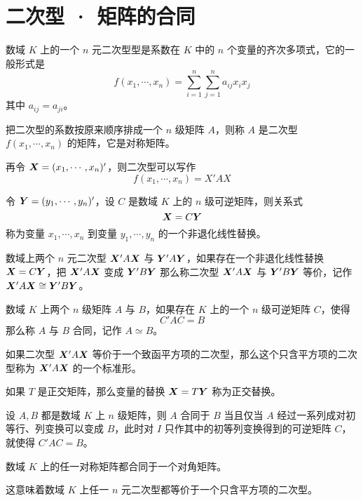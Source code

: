 \chapter{二次型 · 矩阵的合同}

\begin{definition}
    数域 $K$ 上的一个 $n$ 元二次型型是系数在 $K$ 中的 $n$ 个变量的齐次多项式，它的一般形式是
    $$f(x_1,\cdots,x_n) = \sum_{i=1}^n\sum_{j=1}^na_{ij}x_ix_j$$
    其中 $a_{ij} = a_{ji}$。
\end{definition}

把二次型的系数按原来顺序排成一个 $n$ 级矩阵 $A$，则称 $A$ 是二次型 $f(x_1,\cdots,x_n)$ 的矩阵，它是对称矩阵。

再令 $\boldsymbol{X} = (x_1,\cdots,x_n)'$，则二次型可以写作
$$f(x_1,\cdots,x_n) = X'AX$$

令 $\boldsymbol{Y} = (y_1,\cdots,y_n)'$，设 $C$ 是数域 $K$ 上的 $n$ 级可逆矩阵，则关系式
$$\boldsymbol{X} = C\boldsymbol{Y}$$
称为变量 $x_1,\cdots,x_n$ 到变量 $y_1,\cdots,y_n$ 的一个非退化线性替换。

\begin{definition}
    数域上两个 $n$ 元二次型 $\boldsymbol{X}'A\boldsymbol{X}$ 与 $\boldsymbol{Y}'A\boldsymbol{Y}$，如果存在一个非退化线性替换 $\boldsymbol{X} = C\boldsymbol{Y}$，把 $\boldsymbol{X}'A\boldsymbol{X}$ 变成 $\boldsymbol{Y}'B\boldsymbol{Y}$ 那么称二次型 $\boldsymbol{X}'A\boldsymbol{X}$ 与 $\boldsymbol{Y}'B\boldsymbol{Y}$ 等价，记作 $\boldsymbol{X}'A\boldsymbol{X} \cong \boldsymbol{Y}'B\boldsymbol{Y}$。
\end{definition}

\begin{definition}
    数域 $K$ 上两个 $n$ 级矩阵 $A$ 与 $B$，如果存在 $K$ 上的一个 $n$ 级可逆矩阵 $C$，使得
    $$C'AC = B$$
    那么称 $A$ 与 $B$ 合同，记作 $A\simeq B$。
\end{definition}

如果二次型 $\boldsymbol{X}' A \boldsymbol{X}$ 等价于一个致函平方项的二次型，那么这个只含平方项的二次型称为 $\boldsymbol{X}'A\boldsymbol{X}$ 的一个标准形。

如果 $T$ 是正交矩阵，那么变量的替换 $\boldsymbol{X} = T\boldsymbol{Y}$ 称为正交替换。

\begin{theorem}
    设 $A,B$ 都是数域 $K$ 上 $n$ 级矩阵，则 $A$ 合同于 $B$ 当且仅当 $A$ 经过一系列成对初等行、列变换可以变成 $B$，此时对 $I$ 只作其中的初等列变换得到的可逆矩阵 $C$，就使得 $C'AC=B$。
\end{theorem}

\begin{theorem}
    数域 $K$ 上的任一对称矩阵都合同于一个对角矩阵。
\end{theorem}

这意味着数域 $K$ 上任一 $n$ 元二次型都等价于一个只含平方项的二次型。

